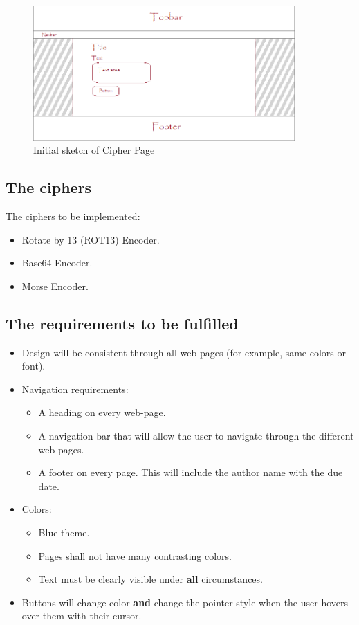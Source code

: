 \documentclass[10pt, a4paper]{article}
\begin{document}
    \begin{figure}[H]
    \centering
    \includegraphics[width=100mm]{images/sketch_2.png}
    \caption{Initial sketch of Cipher Page}
    \end{figure}
    \subsection{The ciphers}
    The ciphers to be implemented:
    \begin{itemize}
    \item Rotate by 13 (ROT13) Encoder.
    \item Base64 Encoder.
    \item Morse Encoder.
    \end{itemize}


    \subsection{The requirements to be fulfilled} 
    \begin{itemize} 
    \item Design will be consistent through all web-pages (for example, same colors or font).
    \item Navigation requirements: 
    \begin{itemize}
    \item A heading on every web-page.
    \item A navigation bar that will allow the user to navigate through the different web-pages. 
    \item A footer on every page. This will include the author name with the due date.
    \end{itemize}
    \item Colors:
    \begin{itemize}
    \item Blue theme. 
    \item Pages shall not have many contrasting colors. 
    \item Text must be clearly visible under \textbf{all} circumstances.
    \end{itemize}
    \item Buttons will change color \textbf{and} change the pointer style when the user hovers over them with their cursor. 
     \end{itemize}
\end{document}
